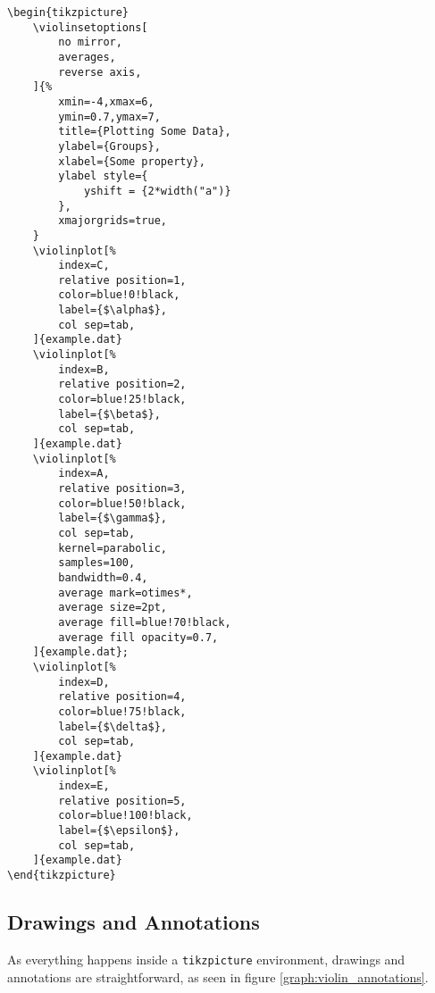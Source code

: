 \documentclass{article}
\begin{document}
\begin{verbatim}
\begin{tikzpicture}
	\violinsetoptions[
		no mirror,
		averages,
		reverse axis,
	]{%
		xmin=-4,xmax=6,
		ymin=0.7,ymax=7,
		title={Plotting Some Data},
		ylabel={Groups},
		xlabel={Some property},
		ylabel style={
			yshift = {2*width("a")}
		},
		xmajorgrids=true,
	}
	\violinplot[%
		index=C,
		relative position=1,
		color=blue!0!black,
		label={$\alpha$},
		col sep=tab,
	]{example.dat}
	\violinplot[%
		index=B,
		relative position=2,
		color=blue!25!black,
		label={$\beta$},
		col sep=tab,
	]{example.dat}
	\violinplot[%
		index=A,
		relative position=3,
		color=blue!50!black,
		label={$\gamma$},
		col sep=tab,
		kernel=parabolic,
		samples=100,
		bandwidth=0.4,
		average mark=otimes*,
		average size=2pt,
		average fill=blue!70!black,
		average fill opacity=0.7,
	]{example.dat};
	\violinplot[%
		index=D,
		relative position=4,
		color=blue!75!black,
		label={$\delta$},
		col sep=tab,
	]{example.dat}
	\violinplot[%
		index=E,
		relative position=5,
		color=blue!100!black,
		label={$\epsilon$},
		col sep=tab,
	]{example.dat}
\end{tikzpicture}
\end{verbatim}

\subsection{Drawings and Annotations}

As everything happens inside a \texttt{tikzpicture} environment, drawings
and annotations are straightforward, as seen in figure \ref{graph:violin_annotations}.
\end{document}
